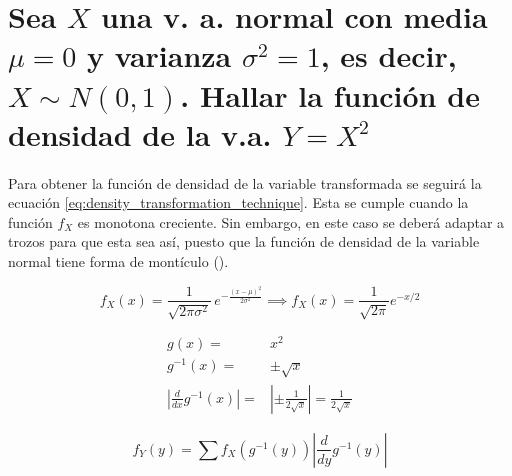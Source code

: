 \documentclass{article}
\begin{document}
	\maketitle
  \thispagestyle{empty}



	\section{Sea $X$ una v. a. normal con media $\mu = 0$ y varianza $\sigma^2 = 1$, es decir, $ X \sim N(0,1)$. Hallar la función de densidad de la v.a. $Y = X^2$}

    \paragraph{}
    Para obtener la función de densidad de la variable transformada se seguirá la ecuación \eqref{eq:density_transformation_technique}. Esta se cumple cuando la función $f_X$ es monotona creciente. Sin embargo, en este caso se deberá adaptar a trozos para que esta sea así, puesto que la función de densidad de la variable normal tiene forma de montículo ().


    \begin{equation}
      f_X(x) = {\displaystyle {\frac {1}{\sqrt {2\pi \sigma ^{2}}}}\,e^{-{\frac {(x-\mu )^{2}}{2\sigma ^{2}}}}} \implies f_X(x) = \frac{1}{\sqrt{2\pi} } e^{-x/2}
    \end{equation}


    \begin{align}
      g(x) =& x^2 \\
      g^{-1}(x) =& \pm \sqrt{x} \\
      \left| \frac{d}{dx} g^{-1} (x) \right| =& \left| \pm \frac{1}{2\sqrt{x}}  \right| = \frac{1}{2\sqrt{x}}
    \end{align}

    \begin{equation}
    \label{eq:density_transformation_technique}
      f_Y (y) = \sum f_X \left( g^{-1} (y) \right) \left| \frac{d}{dy} g^{-1} (y) \right|
    \end{equation}
\end{document}
